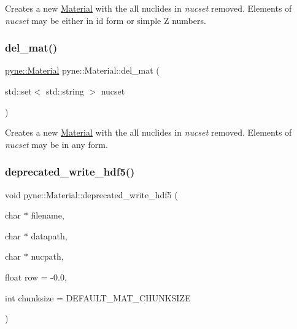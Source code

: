 Creates a new \hyperlink{classpyne_1_1_material}{Material} with the all nuclides in {\itshape nucset} removed. Elements of {\itshape nucset} may be either in id form or simple Z numbers. \mbox{\label{classpyne_1_1_material_a3989e723460e0acffb37163a7f7002c0}} 
\subsubsection{\texorpdfstring{del\+\_\+mat()}{del\_mat()}\hspace{0.1cm}{\footnotesize\ttfamily [2/2]}}
{\footnotesize\ttfamily \hyperlink{classpyne_1_1_material}{pyne\+::\+Material} pyne\+::\+Material\+::del\+\_\+mat (\begin{DoxyParamCaption}\item[{std\+::set$<$ std\+::string $>$}]{nucset }\end{DoxyParamCaption})}

Creates a new \hyperlink{classpyne_1_1_material}{Material} with the all nuclides in {\itshape nucset} removed. Elements of {\itshape nucset} may be in any form. \mbox{\label{classpyne_1_1_material_a93113f7a182deae73ea406b96c6bfe10}} 
\subsubsection{\texorpdfstring{deprecated\+\_\+write\+\_\+hdf5()}{deprecated\_write\_hdf5()}\hspace{0.1cm}{\footnotesize\ttfamily [1/3]}}
{\footnotesize\ttfamily void pyne\+::\+Material\+::deprecated\+\_\+write\+\_\+hdf5 (\begin{DoxyParamCaption}\item[{char $\ast$}]{filename,  }\item[{char $\ast$}]{datapath,  }\item[{char $\ast$}]{nucpath,  }\item[{float}]{row = {\ttfamily -\/0.0},  }\item[{int}]{chunksize = {\ttfamily DEFAULT\+\_\+MAT\+\_\+CHUNKSIZE} }\end{DoxyParamCaption})}

